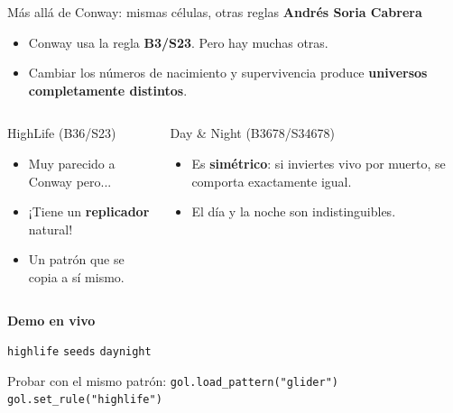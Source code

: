 \documentclass[10pt,aspectratio=169]{beamer}
\newcommand{\demo}[1]{\textcolor{democolor}{\texttt{#1}}}
\begin{document}
\begin{frame}{Más allá de Conway: mismas células, otras reglas}
  \textbf{Andrés Soria Cabrera}

  \vspace{0.4cm}

  \begin{itemize}
    \item Conway usa la regla \textbf{B3/S23}. Pero hay muchas otras.
    \item Cambiar los números de nacimiento y supervivencia produce
          \textbf{universos completamente distintos}.
  \end{itemize}

  \vspace{0.3cm}

  \begin{columns}[T]
    \begin{block}{HighLife (B36/S23)}
      \begin{itemize}
        \item Muy parecido a Conway pero...
        \item ¡Tiene un \textbf{replicador} natural!
        \item Un patrón que se copia a sí mismo.
      \end{itemize}
    \end{block}

    \begin{block}{Day \& Night (B3678/S34678)}
      \begin{itemize}
        \item Es \textbf{simétrico}: si inviertes vivo por muerto,
              se comporta exactamente igual.
        \item El día y la noche son indistinguibles.
      \end{itemize}
    \end{block}
  \end{columns}

  \vspace{0.3cm}

  \begin{center}
    \textbf{Demo en vivo}

    \demo{highlife} \quad \demo{seeds} \quad \demo{daynight}

    \small Probar con el mismo patrón: \texttt{gol.load\_pattern("glider")}
    \texttt{gol.set\_rule("highlife")}
  \end{center}
\end{frame}
\end{document}
